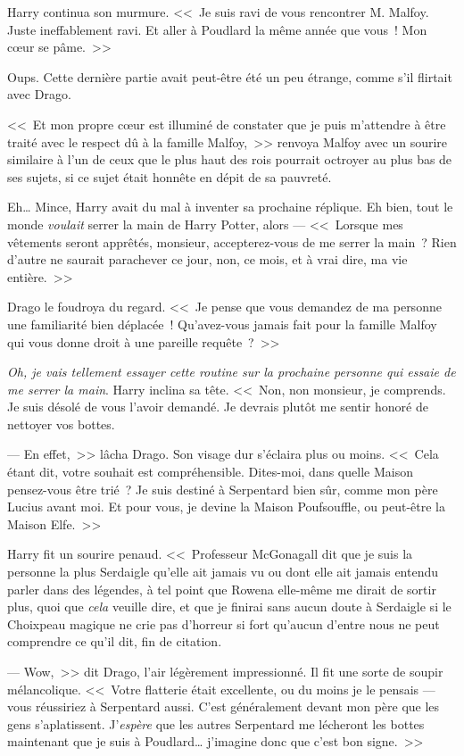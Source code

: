 Harry continua son murmure. <<~Je suis ravi de vous rencontrer M. Malfoy. Juste ineffablement ravi. Et aller à Poudlard la même année que vous~! Mon cœur se pâme.~>>

Oups. Cette dernière partie avait peut-être été un peu étrange, comme s'il flirtait avec Drago.

<<~Et mon propre cœur est illuminé de constater que je puis m'attendre à être traité avec le respect dû à la famille Malfoy,~>> renvoya Malfoy avec un sourire similaire à l'un de ceux que le plus haut des rois pourrait octroyer au plus bas de ses sujets, si ce sujet était honnête en dépit de sa pauvreté.

Eh… Mince, Harry avait du mal à inventer sa prochaine réplique. Eh bien, tout le monde \emph{voulait} serrer la main de Harry Potter, alors — <<~Lorsque mes vêtements seront apprêtés, monsieur, accepterez-vous de me serrer la main~? Rien d'autre ne saurait parachever ce jour, non, ce mois, et à vrai dire, ma vie entière.~>>

Drago le foudroya du regard.
<<~Je pense que vous demandez de ma personne une familiarité bien déplacée~! Qu'avez-vous jamais fait pour la famille Malfoy qui vous donne droit à une pareille requête~?~>>

\emph{Oh, je vais tellement essayer cette routine sur la prochaine personne qui essaie de me serrer la main}. Harry inclina sa tête.
<<~Non, non monsieur, je comprends. Je suis désolé de vous l'avoir demandé. Je devrais plutôt me sentir honoré de nettoyer vos bottes.

--- En effet,~>> lâcha Drago. Son visage dur s'éclaira plus ou moins. <<~Cela étant dit, votre souhait est compréhensible. Dites-moi, dans quelle Maison pensez-vous être trié~? Je suis destiné à Serpentard bien sûr, comme mon père Lucius avant moi. Et pour vous, je devine la Maison Poufsouffle, ou peut-être la Maison Elfe.~>>

Harry fit un sourire penaud.
<<~Professeur McGonagall dit que je suis la personne la plus Serdaigle qu'elle ait jamais vu ou dont elle ait jamais entendu parler dans des légendes, à tel point que Rowena elle-même me dirait de sortir plus, quoi que \emph{cela} veuille dire, et que je finirai sans aucun doute à Serdaigle si le Choixpeau magique ne crie pas d'horreur si fort qu'aucun d'entre nous ne peut comprendre ce qu'il dit, fin de citation.

--- Wow,~>> dit Drago, l'air légèrement impressionné. Il fit une sorte de soupir mélancolique. <<~Votre flatterie était excellente, ou du moins je le pensais — vous réussiriez à Serpentard aussi. C'est généralement devant mon père que les gens s'aplatissent. J'\emph{espère} que les autres Serpentard me lécheront les bottes maintenant que je suis à Poudlard… j'imagine donc que c'est bon signe.~>>

